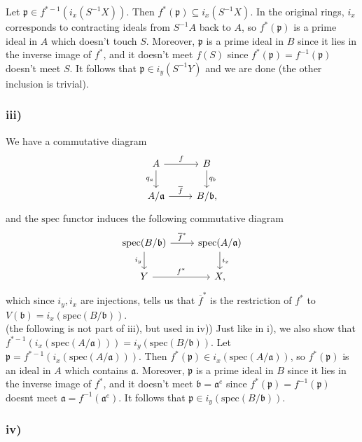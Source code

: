 \documentclass{article}
\theoremstyle{definition}
\newcommand{\spec}{\text{spec}}
\begin{document}
Let $\mathfrak{p} \in f^{*-1}(i_x(S^{-1}X))$. Then $f^{*}(\mathfrak{p})
\subseteq i_x(S^{-1}X)$. In the original rings, $i_x$ corresponds to
contracting ideals from $S^{-1}A$ back to $A$, so $f^{*}(\mathfrak{p})$ is a
prime ideal in $A$ which doesn't touch $S$. Moreover, $\mathfrak{p}$ is a prime
ideal in $B$ since it lies in the inverse image of $f^{*}$, and it doesn't meet
$f(S)$ since $f^{*}(\mathfrak{p}) = f^{-1}(\mathfrak{p})$ doesn't meet $S$.
It follows that $\mathfrak{p} \in i_y(S^{-1}Y)$ and we are done (the other
inclusion is trivial).

\subsubsection*{iii)}
We have a commutative diagram
\[ 
	\begin{tikzcd}
		A \arrow{r}{f} \arrow[swap]{d}{q_a} & B \arrow{d}{q_b} \\
		A/\mathfrak{a} \arrow{r}{\overline{f}}& B/\mathfrak{b},
	\end{tikzcd}
\]
and the $\spec$ functor induces the following commutative diagram
\[ 
	\begin{tikzcd}
		\spec(B/\mathfrak{b}) \arrow{r}{\overline{f}^{*}} \arrow[swap]{d}{i_y} & \spec(A/\mathfrak{a}) \arrow{d}{i_x} \\
		Y \arrow{r}{f^{*}}& X,
	\end{tikzcd}
\]
which since $i_y, i_x$ are injections, tells us that $\overline{f}^{*}$ is the
restriction of $f^{*}$ to $V(\mathfrak{b}) = i_x(\spec(B/\mathfrak{b}))$. \\

(the following is not part of iii), but used in iv)) Just like in i), we also
show that $f^{*-1}(i_x(\spec(A/\mathfrak{a}))) = i_y(\spec(B/\mathfrak{b}))$.
Let $\mathfrak{p} = f^{*-1}(i_x(\spec(A/\mathfrak{a})))$. Then
$f^{*}(\mathfrak{p}) \in i_x(\spec(A/\mathfrak{a}))$, so $f^{*}(\mathfrak{p})$
is an ideal in $A$ which contains $\mathfrak{a}$. Moreover, $\mathfrak{p}$ is a
prime ideal in $B$ since it lies in the inverse image of $f^{*}$, and it
doesn't meet $\mathfrak{b} = \mathfrak{a}^{e}$ since $f^{*}(\mathfrak{p}) =
f^{-1}(\mathfrak{p})$ doesnt meet $\mathfrak{a} = f^{-1}(\mathfrak{a}^{e})$.
It follows that $\mathfrak{p} \in i_y(\spec(B/\mathfrak{b}))$.


\subsubsection*{iv)}
\end{document}
